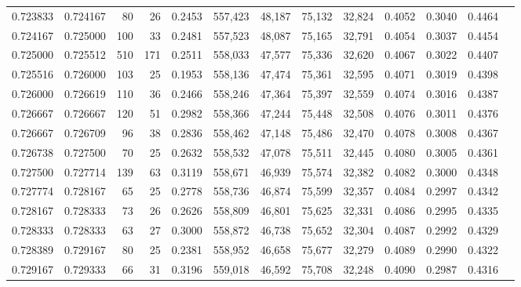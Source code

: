 \begin{tabular}{rrrrrrrrrrrrr}
0.723833 & 0.724167 &    80 &  26 &                                     0.2453 & 557,423 &  48,187 &  75,132 &  32,824 & 0.4052 & 0.3040 & 0.4464 \\
0.724167 & 0.725000 &   100 &  33 &                                     0.2481 & 557,523 &  48,087 &  75,165 &  32,791 & 0.4054 & 0.3037 & 0.4454 \\
0.725000 & 0.725512 &   510 & 171 &                                     0.2511 & 558,033 &  47,577 &  75,336 &  32,620 & 0.4067 & 0.3022 & 0.4407 \\
0.725516 & 0.726000 &   103 &  25 &                                     0.1953 & 558,136 &  47,474 &  75,361 &  32,595 & 0.4071 & 0.3019 & 0.4398 \\
0.726000 & 0.726619 &   110 &  36 &                                     0.2466 & 558,246 &  47,364 &  75,397 &  32,559 & 0.4074 & 0.3016 & 0.4387 \\
0.726667 & 0.726667 &   120 &  51 &                                     0.2982 & 558,366 &  47,244 &  75,448 &  32,508 & 0.4076 & 0.3011 & 0.4376 \\
0.726667 & 0.726709 &    96 &  38 &                                     0.2836 & 558,462 &  47,148 &  75,486 &  32,470 & 0.4078 & 0.3008 & 0.4367 \\
0.726738 & 0.727500 &    70 &  25 &                                     0.2632 & 558,532 &  47,078 &  75,511 &  32,445 & 0.4080 & 0.3005 & 0.4361 \\
0.727500 & 0.727714 &   139 &  63 &                                     0.3119 & 558,671 &  46,939 &  75,574 &  32,382 & 0.4082 & 0.3000 & 0.4348 \\
0.727774 & 0.728167 &    65 &  25 &                                     0.2778 & 558,736 &  46,874 &  75,599 &  32,357 & 0.4084 & 0.2997 & 0.4342 \\
0.728167 & 0.728333 &    73 &  26 &                                     0.2626 & 558,809 &  46,801 &  75,625 &  32,331 & 0.4086 & 0.2995 & 0.4335 \\
0.728333 & 0.728333 &    63 &  27 &                                     0.3000 & 558,872 &  46,738 &  75,652 &  32,304 & 0.4087 & 0.2992 & 0.4329 \\
0.728389 & 0.729167 &    80 &  25 &                                     0.2381 & 558,952 &  46,658 &  75,677 &  32,279 & 0.4089 & 0.2990 & 0.4322 \\
0.729167 & 0.729333 &    66 &  31 &                                     0.3196 & 559,018 &  46,592 &  75,708 &  32,248 & 0.4090 & 0.2987 & 0.4316 \\

\end{tabular}
